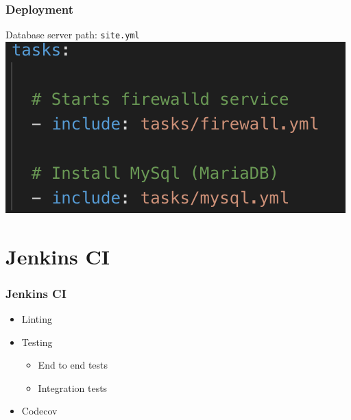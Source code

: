 \documentclass[12pt]{beamer}
\begin{document}
    \begin{frame}
        \frametitle{Deployment}
        Database server
        \newline
        path: \texttt{site.yml}
        \newline
   		\includegraphics[scale=.50]{assets/deploy_databaseserver.png}
    \end{frame}

    \section{Jenkins CI}
    
	\begin{frame}
		\frametitle{Jenkins CI}
		\begin{itemize}
            \item Linting
            \item Testing
            \begin{itemize}
                \item End to end tests
                \item Integration tests
            \end{itemize}
            \item Codecov
		\end{itemize}
    \end{frame}
\end{document}
